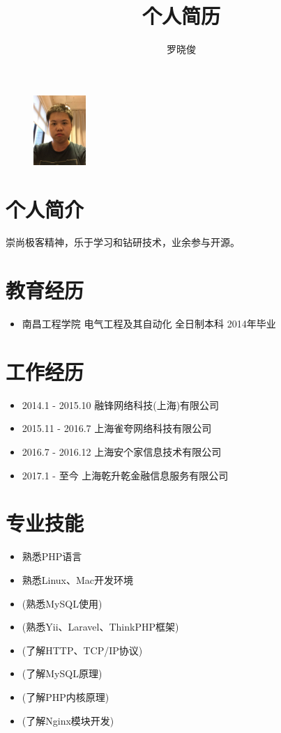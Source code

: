 \documentclass[a4paper,12pt]{article}
\title{个人简历}
\author{罗晓俊}
\begin{document}
	\begin{CJK}{UTF8}{gbsn}

		\maketitle{}

		\begin{figure}[h]
			\centering\includegraphics[height=100px]{webwxgetmsgimg.jpeg}
		\end{figure}

		\section{个人简介}
			崇尚极客精神，乐于学习和钻研技术，业余参与开源。
		
		\section{教育经历}
			\begin{itemize}
				\item{南昌工程学院 电气工程及其自动化 全日制本科 2014年毕业}
			\end{itemize}
		
		\section{工作经历}
			\begin{itemize}
				\item{2014.1 - 2015.10 融锋网络科技(上海)有限公司}
				\item{2015.11 - 2016.7 上海雀夸网络科技有限公司}
				\item{2016.7 - 2016.12 上海安个家信息技术有限公司}
				\item{2017.1 - 至今 上海乾升乾金融信息服务有限公司}
			\end{itemize}
		
		\section{专业技能}
			\begin{itemize}
				\item{熟悉PHP语言}
				\item{熟悉Linux、Mac开发环境}
				\item(熟悉MySQL使用)
				\item(熟悉Yii、Laravel、ThinkPHP框架)
				\item(了解HTTP、TCP/IP协议)
				\item(了解MySQL原理)
				\item(了解PHP内核原理)
				\item(了解Nginx模块开发)
			\end{itemize}
		

\end{CJK}
\end{document}
